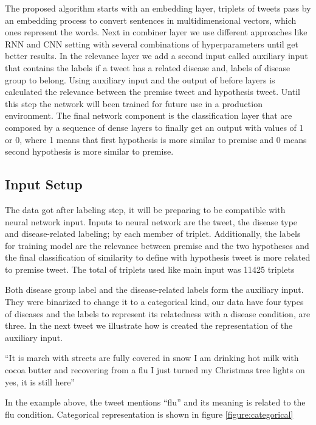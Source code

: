 \documentclass[12pt]{report}
\begin{document}
The proposed algorithm starts with an embedding layer, triplets of tweets pass by an embedding process to convert sentences in multidimensional vectors, which ones represent the words. Next in combiner layer we use different approaches like \ac{RNN} and \ac{CNN} setting with several combinations of hyperparameters until get better results.
In the relevance layer we add a second input called auxiliary input that contains the labels if a tweet has a related disease and, labels of disease group to belong. Using auxiliary input and the output of before layers is calculated the relevance between the premise tweet and hypothesis tweet. Until this step the network will been trained for future use in a production environment.
The final network component is the classification layer that are composed by a sequence of dense layers to finally get an output with values of 1 or 0, where 1 means that first hypothesis is more similar to premise and 0 means second hypothesis is more similar to premise.


\subsection{Input Setup}
The data got after labeling step, it will be preparing to be compatible with neural network input. Inputs to neural network are the tweet, the disease type and disease-related labeling; by each member of triplet. Additionally, the labels for training model are the relevance between premise and the two hypotheses and the final classification of similarity to define with hypothesis tweet is more related to premise tweet. The total of triplets used like main input was 11425 triplets

Both disease group label and the disease-related labels form the auxiliary input. They were binarized to change it to a categorical kind, our data have four types of diseases and the labels to represent its relatedness with a disease condition, are three. In the next tweet we illustrate how is created the representation of the auxiliary input.

\begin{definition}
``It is march with streets are fully covered in snow I am drinking hot milk with cocoa butter and recovering from a flu I just turned my Christmas tree lights on yes, it is still here''
\end{definition}

In the example above, the tweet mentions ``flu'' and its meaning is related to the flu condition. Categorical representation is shown in figure \ref{figure:categorical}
\end{document}

